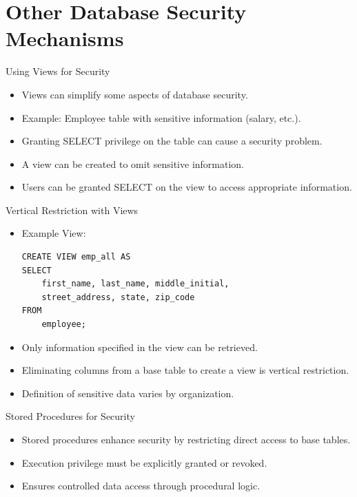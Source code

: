 \documentclass[aspectratio=169]{beamer}
\begin{document}
\section{Other Database Security Mechanisms}

\begin{frame}{Using Views for Security}
    \begin{itemize}
        \item Views can simplify some aspects of database security.
        \item Example: Employee table with sensitive information (salary, etc.).
        \item Granting SELECT privilege on the table can cause a security problem.
        \item A view can be created to omit sensitive information.
        \item Users can be granted SELECT on the view to access appropriate information.
    \end{itemize}
\end{frame}

\begin{frame}[fragile]{Vertical Restriction with Views}
    \begin{itemize}
        \item Example View:
        {\scriptsize
        \begin{verbatim}
CREATE VIEW emp_all AS
SELECT
    first_name, last_name, middle_initial,
    street_address, state, zip_code
FROM
    employee;
        \end{verbatim}
        }
        \item Only information specified in the view can be retrieved.
        \item Eliminating columns from a base table to create a view is vertical restriction.
        \item Definition of sensitive data varies by organization.
    \end{itemize}
\end{frame}

\begin{frame}{Stored Procedures for Security}
    \begin{itemize}
        \item Stored procedures enhance security by restricting direct access to base tables.
        \item Execution privilege must be explicitly granted or revoked.
        \item Ensures controlled data access through procedural logic.
    \end{itemize}
\end{frame}
\end{document}
